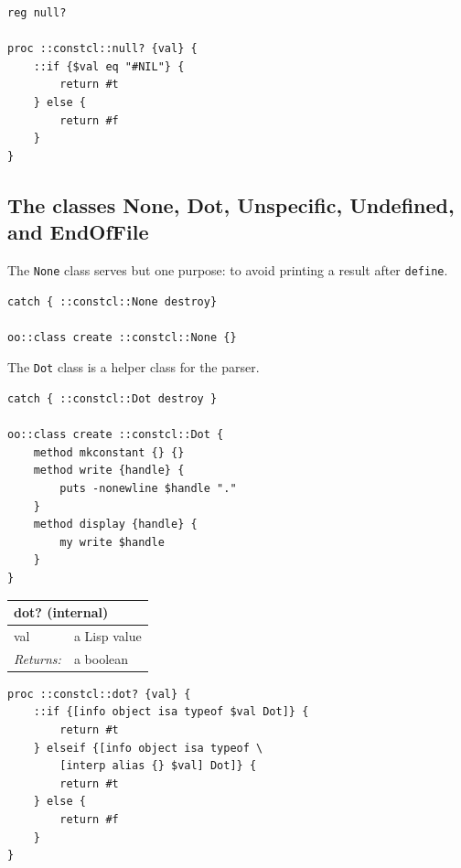\documentclass[twoside,9pt]{report}
\begin{document}
\noindent\makebox[\linewidth]{\rule{\linewidth}{0.4pt}}
\begin{lstlisting}
reg null?
 
proc ::constcl::null? {val} {
    ::if {$val eq "#NIL"} {
        return #t
    } else {
        return #f
    }
}
\end{lstlisting}
\noindent\makebox[\linewidth]{\rule{\linewidth}{0.4pt}}
\subsection{The classes None, Dot, Unspecific, Undefined, and EndOfFile}
\label{the-classes-none,-dot,-unspecific,-undefined,-and-endoffile}

The \texttt{None} class serves but one purpose: to avoid printing a result after \texttt{define}.

\noindent\makebox[\linewidth]{\rule{\linewidth}{0.4pt}}
\begin{lstlisting}
catch { ::constcl::None destroy}
 
oo::class create ::constcl::None {}
\end{lstlisting}
\noindent\makebox[\linewidth]{\rule{\linewidth}{0.4pt}}

The \texttt{Dot} class is a helper class for the parser.

\noindent\makebox[\linewidth]{\rule{\linewidth}{0.4pt}}
\begin{lstlisting}
catch { ::constcl::Dot destroy }
 
oo::class create ::constcl::Dot {
    method mkconstant {} {}
    method write {handle} {
        puts -nonewline $handle "."
    }
    method display {handle} {
        my write $handle
    }
}
\end{lstlisting}
\noindent\makebox[\linewidth]{\rule{\linewidth}{0.4pt}}
\begin{tabular}{ |l l| }
\hline
\multicolumn{2}{|l|}{dot? (internal)} \\
\hline
val & a Lisp value \\
\textit{Returns:} & a boolean \\
\hline
\end{tabular}

\noindent\makebox[\linewidth]{\rule{\linewidth}{0.4pt}}
\begin{lstlisting}
proc ::constcl::dot? {val} {
    ::if {[info object isa typeof $val Dot]} {
        return #t
    } elseif {[info object isa typeof \
        [interp alias {} $val] Dot]} {
        return #t
    } else {
        return #f
    }
}
\end{lstlisting}
\noindent\makebox[\linewidth]{\rule{\linewidth}{0.4pt}}
\end{document}
